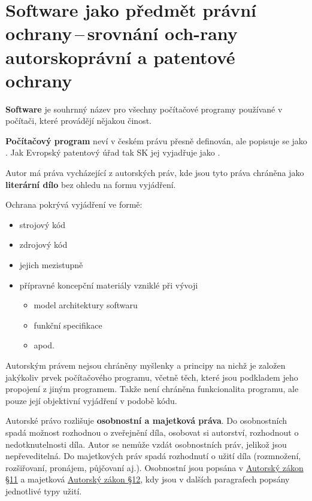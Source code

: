 \section[Software jako předmět právní ochrany\,--\,srovnání ochrany autorskoprávní a patentové ochrany]{Software jako předmět právní ochrany\,--\,srovnání och-rany autorskoprávní a patentové ochrany}









\textbf{Software} je souhrnný název pro všechny počítačové programy používané v počítači, které provádějí nějakou činost.











\textbf{Počítačový program} neví v českém právu přesně definován, ale popisuje se jako . Jak Evropský patentový úřad tak SK jej vyjadřuje jako .

Autor má práva vycházející z autorských práv, kde jsou tyto práva chráněna jako \textbf{literární dílo} bez ohledu na formu vyjádření.

Ochrana pokrývá vyjádření ve formě:
\begin{itemize}[noitemsep]
    \item strojový kód
    \item zdrojový kód
    \item jejich mezistupně
    \item přípravné koncepční materiály vzniklé při vývoji
    \begin{itemize}[noitemsep]
        \item model architektury softwaru
        \item funkční specifikace
        \item apod.
    \end{itemize}
\end{itemize}

Autorským právem nejsou chráněny myšlenky a principy na nichž je založen jakýkoliv prvek počítačového programu, včetně těch, které jsou podkladem jeho propojení z jiným programem. Takže není chráněna funkcionalita programu, ale pouze její objektivní vyjádření v podobě kódu.

Autorské právo rozlišuje \textbf{osobnostní a majetková práva}. Do osobnostních spadá možnost rozhodnou o zveřejnění díla, osobovat si autorství, rozhodnout o nedotknutelnosti díla. Autor se nemůže vzdát osobnostních práv, jelikož jsou nepřeveditelná. Do majetkových práv spadá rozhodnutí o užití díla (rozmnožení, rozšiřovaní, pronájem, půjčovaní aj.). Osobnostní jsou popsána v \href{https://www.zakonyprolidi.cz/cs/2000-121#p11}{Autorský zákon §11} a majetková  \href{https://www.zakonyprolidi.cz/cs/2000-121#p12}{Autorský zákon §12}, kdy jsou v dalších paragrafech popsány jednotlivé typy užití. 

